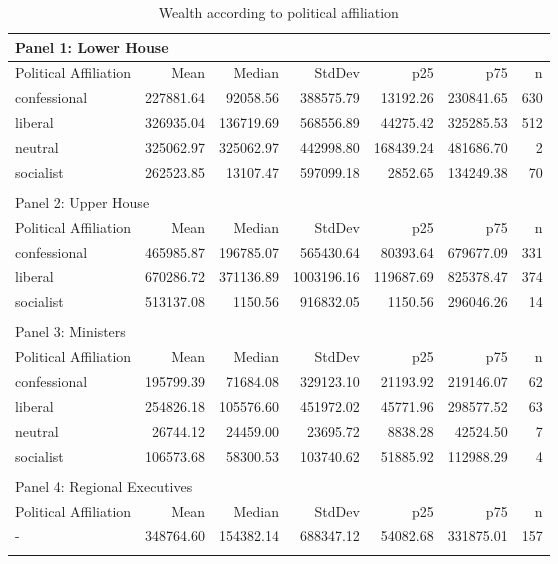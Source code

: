 \begin{table}[ht]
\centering
\begin{tabular}{lrrrrrr}
   
\multicolumn{7}{l}{Panel 1: Lower House}\\ 
\hline
Political Affiliation & Mean & Median & StdDev & p25 & p75 & n \\\hline

confessional & 227881.64 & 92058.56 & 388575.79 & 13192.26 & 230841.65 & 630 \\ 
  liberal & 326935.04 & 136719.69 & 568556.89 & 44275.42 & 325285.53 & 512 \\ 
  neutral & 325062.97 & 325062.97 & 442998.80 & 168439.24 & 481686.70 &   2 \\ 
  socialist & 262523.85 & 13107.47 & 597099.18 & 2852.65 & 134249.38 &  70 \\ 
   \hline\\ 
\multicolumn{7}{l}{Panel 2: Upper House}\\ 
\hline
Political Affiliation & Mean & Median & StdDev & p25 & p75 & n \\\hline
confessional & 465985.87 & 196785.07 & 565430.64 & 80393.64 & 679677.09 & 331 \\ 
  liberal & 670286.72 & 371136.89 & 1003196.16 & 119687.69 & 825378.47 & 374 \\ 
  socialist & 513137.08 & 1150.56 & 916832.05 & 1150.56 & 296046.26 &  14 \\ 
   \hline\\ 
\multicolumn{7}{l}{Panel 3: Ministers}\\ 
\hline
Political Affiliation & Mean & Median & StdDev & p25 & p75 & n \\\hline
confessional & 195799.39 & 71684.08 & 329123.10 & 21193.92 & 219146.07 &  62 \\ 
  liberal & 254826.18 & 105576.60 & 451972.02 & 45771.96 & 298577.52 &  63 \\ 
  neutral & 26744.12 & 24459.00 & 23695.72 & 8838.28 & 42524.50 &   7 \\ 
  socialist & 106573.68 & 58300.53 & 103740.62 & 51885.92 & 112988.29 &   4 \\ 
   \hline\\ 
\multicolumn{7}{l}{Panel 4: Regional Executives}\\ 
\hline
Political Affiliation & Mean & Median & StdDev & p25 & p75 & n \\\hline
- & 348764.60 & 154382.14 & 688347.12 & 54082.68 & 331875.01 & 157 \\ 
   \hline
\multicolumn{7}{l}{}\\
\end{tabular}
\caption{Wealth according to political affiliation} 
\label{tab:wealthfunction}
\end{table}